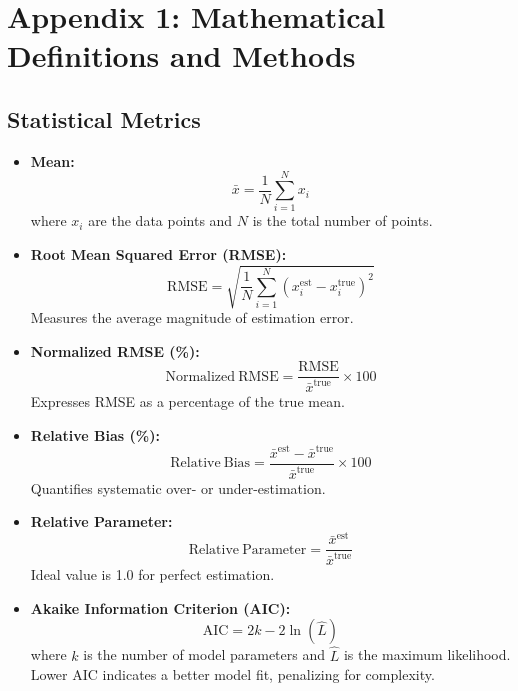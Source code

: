 \documentclass[a4paper,12pt]{article}
\begin{document}
\appendix

\section*{Appendix 1: Mathematical Definitions and Methods}

\subsection*{Statistical Metrics}

\begin{itemize}
    \item \textbf{Mean:}
    \begin{equation}
        \bar{x} = \frac{1}{N} \sum_{i=1}^{N} x_i
    \end{equation}
    where $x_i$ are the data points and $N$ is the total number of points.

    \item \textbf{Root Mean Squared Error (RMSE):}
    \begin{equation}
        \mathrm{RMSE} = \sqrt{ \frac{1}{N} \sum_{i=1}^{N} (x_i^{\text{est}} - x_i^{\text{true}})^2 }
    \end{equation}
    Measures the average magnitude of estimation error.

    \item \textbf{Normalized RMSE (\%):}
    \begin{equation}
        \mathrm{Normalized~RMSE} = \frac{\mathrm{RMSE}}{\bar{x}^{\text{true}}} \times 100
    \end{equation}
    Expresses RMSE as a percentage of the true mean.

    \item \textbf{Relative Bias (\%):}
    \begin{equation}
        \mathrm{Relative~Bias} = \frac{ \bar{x}^{\text{est}} - \bar{x}^{\text{true}} }{ \bar{x}^{\text{true}} } \times 100
    \end{equation}
    Quantifies systematic over- or under-estimation.

    \item \textbf{Relative Parameter:}
    \begin{equation}
        \mathrm{Relative~Parameter} = \frac{ \bar{x}^{\text{est}} }{ \bar{x}^{\text{true}} }
    \end{equation}
    Ideal value is 1.0 for perfect estimation.

    \item \textbf{Akaike Information Criterion (AIC):}
    \begin{equation}
        \mathrm{AIC} = 2k - 2\ln(\hat{L})
    \end{equation}
    where $k$ is the number of model parameters and $\hat{L}$ is the maximum likelihood. Lower AIC indicates a better model fit, penalizing for complexity.
\end{itemize}
\end{document}
